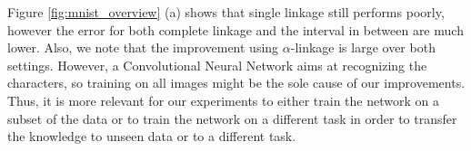 
Figure \ref{fig:mnist_overview} (a) shows that single linkage still performs poorly, however the error for both complete linkage and the interval in between are much lower. Also, we note that the improvement using $\alpha$-linkage is large over both settings. However, a Convolutional Neural Network aims at recognizing the characters, so training on all images might be the sole cause of our improvements. Thus, it is more relevant for our experiments to either train the network on a subset of the data or to train the network on a different task in order to transfer the knowledge to unseen data or to a different task.

